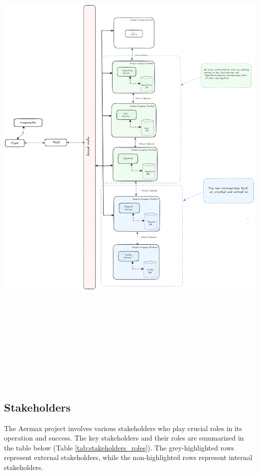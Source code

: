 \begin{minipage}{\linewidth}
    \centering
    \includegraphics[width=15cm , height=25cm]{src/assets/chapters/AermaxArchitecture.png}
\end{minipage}

\subsection{Stakeholders}
The Aermax project involves various stakeholders who play crucial roles in its operation and success. The key stakeholders and their roles are summarized in the table below (Table \ref{tab:stakeholders_roles}). The grey-highlighted rows represent external stakeholders, while the non-highlighted rows represent internal stakeholders.

